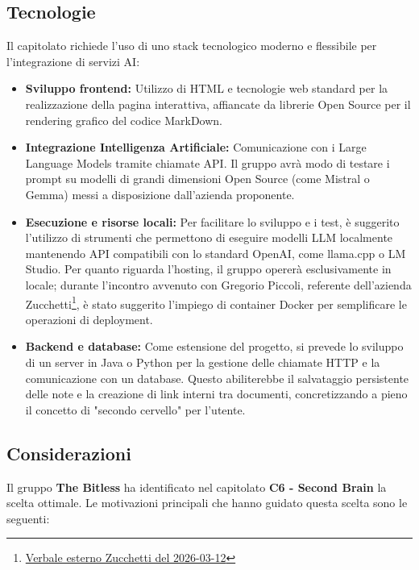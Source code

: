\documentclass[a4paper, 10pt, colorlinks=true, linkcolor=black, urlcolor=blue, citecolor=blue, hidelinks]{article}
\begin{document}
\subsection{Tecnologie}
Il capitolato richiede l'uso di uno stack tecnologico moderno e flessibile per l'integrazione di servizi AI:
\begin{itemize}
    \item \textbf{Sviluppo frontend:} Utilizzo di HTML e tecnologie web standard per la realizzazione della pagina interattiva, affiancate da librerie Open Source per il rendering grafico del codice MarkDown.
    \item \textbf{Integrazione Intelligenza Artificiale:} Comunicazione con i Large Language Models tramite chiamate API. Il gruppo avrà modo di testare i prompt su modelli di grandi dimensioni Open Source (come Mistral o Gemma) messi a disposizione dall'azienda proponente.
    \item \textbf{Esecuzione e risorse locali:} Per facilitare lo sviluppo e i test, è suggerito l'utilizzo di strumenti che permettono di eseguire modelli LLM localmente mantenendo API compatibili con lo standard OpenAI, come llama.cpp o LM Studio. Per quanto riguarda l'hosting, il gruppo opererà esclusivamente in locale; durante l'incontro avvenuto con Gregorio Piccoli, referente dell'azienda Zucchetti\footnote{\href{https://github.com/thebitless-group-swe/thebitless.github.io/blob/main/candidatura/verbali/verbali_esterni/VE_2026-03-12_Zucchetti/VE_2026-03-12_Zucchetti.pdf}{Verbale esterno Zucchetti del 2026-03-12}}, è stato suggerito l'impiego di container Docker per semplificare le operazioni di deployment.
    \item \textbf{Backend e database:} Come estensione del progetto, si prevede lo sviluppo di un server in Java o Python per la gestione delle chiamate HTTP e la comunicazione con un database. Questo abiliterebbe il salvataggio persistente delle note e la creazione di link interni tra documenti, concretizzando a pieno il concetto di "secondo cervello" per l'utente.
\end{itemize}


\subsection{Considerazioni}

Il gruppo \textbf{The Bitless} ha identificato nel capitolato \textbf{C6 - Second Brain} la scelta ottimale.  Le motivazioni principali che hanno guidato questa scelta sono le seguenti:
\end{document}
